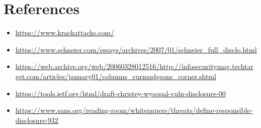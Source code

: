 \documentclass[12pt]{article}
\begin{document}
\section*{References}
\begin{itemize}[label=]
	\item \url{https://www.krackattacks.com/}
	\item \url{https://www.schneier.com/essays/archives/2007/01/schneier_full_disclo.html}
  \item \url{https://web.archive.org/web/20060328012516/http://infosecuritymag.techtarget.com/articles/january01/columns_curmudgeons_corner.shtml}
  \item \url{https://tools.ietf.org/html/draft-christey-wysopal-vuln-disclosure-00}
  \item \url{https://www.sans.org/reading-room/whitepapers/threats/define-responsible-disclosure-932}
\end{itemize}
\end{document}
